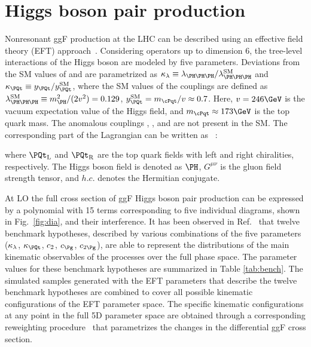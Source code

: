 \documentclass[11pt,twoside,a4paper,cmspaper,final,collab]{cms-tdr}
\begin{document}
\section{Higgs boson pair production}
\label{sec:BSM}
Nonresonant ggF \HH production at the LHC can be described using an effective field theory (EFT) approach~\cite{deFlorian:2016spz}. Considering operators up to dimension 6, the tree-level interactions of the Higgs boson are modeled by five parameters. Deviations from the SM values of \lbdHHH and \yt are parametrized as $\kapl \equiv \lbdHHH/\lbdSM$ and $\kapt \equiv \yt/\ytSM$, where the SM values of the couplings are defined as $\lbdSM \equiv \mH^2 /(2 v^2) = 0.129$, $\ytSM = \mt/v \approx 0.7$. Here, $v = 246\GeV$ is the vacuum expectation value of the Higgs field, and $\mt \approx 173\GeV$ is the top quark mass. The anomalous couplings \cgg, \ctwo, and \cg are not present in the SM. The corresponding part of the Lagrangian can be written as ~\cite{Giudice:2007fh}:

where  $\PQt_\text{L}$ and $\PQt_\text{R}$ are the top quark fields with left and right chiralities, respectively. The Higgs boson field is denoted as $\PH$, $G^{\mu \nu}$ is the gluon field strength tensor, and $h.c.$ denotes the Hermitian conjugate.

At LO the full cross section of ggF Higgs boson pair production can be expressed by a polynomial with 15 terms corresponding to five individual diagrams, shown in Fig.~\ref{fig:dia}, and their interference.
It has been observed in Ref.~\cite{Dall'Osso:2015aia} that twelve benchmark hypotheses, described by various combinations of the five parameters ($\kappa_{\lambda}$, $\kapt$, $c_2$, $\cg$, $\cgg$), are able to represent the distributions of the main kinematic observables of the \HH processes over the full phase space. The parameter values for these benchmark hypotheses are summarized in Table \ref{tab:bench}. The simulated samples generated with the EFT parameters that describe the twelve benchmark hypotheses are combined to cover all possible kinematic configurations of the EFT parameter space.
 The specific kinematic configurations at any point in the full 5D parameter space are obtained through a corresponding reweighting procedure~\cite{Dall'Osso:2015aia} that parametrizes the changes in the differential ggF \HH cross section. 
\end{document}
